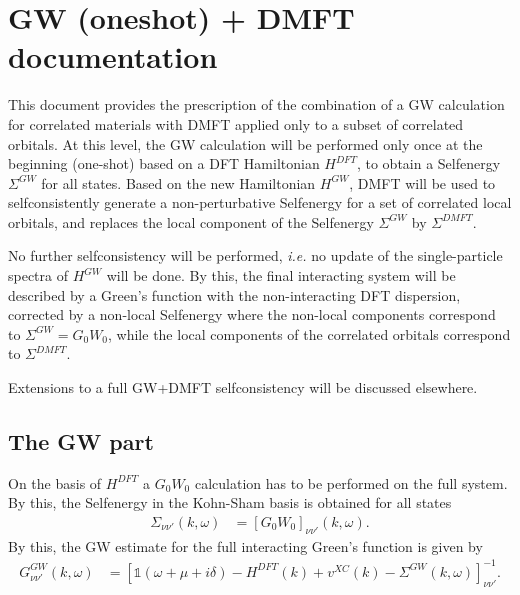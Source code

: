 \documentclass[12pt,a4paper]{scrartcl}
\numberwithin{equation}{subsection}
\newcommand{\GF}{Green's function}
\newcommand{\unity}{\mathds{1}}
\begin{document}
\section{GW (oneshot) + DMFT documentation}

This document  provides the prescription of the combination of a GW calculation
for correlated materials with DMFT applied only to a subset of correlated orbitals.
At this level, the GW calculation will be performed only once at the beginning (one-shot)
based on a DFT Hamiltonian $H^{DFT}$,
to obtain a Selfenergy $\Sigma^{GW}$ for all states. 
Based on the new Hamiltonian $H^{GW}$,
DMFT will be used to selfconsistently generate a non-perturbative Selfenergy for a set of correlated
local orbitals, and replaces the local component of the Selfenergy $\Sigma^{GW}$ by $\Sigma^{DMFT}$.

No further selfconsistency will be performed, {\it i.e.} no update of the single-particle
spectra of $H^{GW}$ will be done. By this, the final interacting system will be
described by a {\GF} with the non-interacting DFT dispersion, corrected by
a non-local Selfenergy where the non-local components
correspond to $\Sigma^{GW}=G_0W_0$, while the local components
of the correlated orbitals correspond to $\Sigma^{DMFT}$.

Extensions to a full GW+DMFT selfconsistency will be discussed elsewhere.


\subsection{The GW part}

On the basis of $H^{DFT}$ a $G_0W_0$ calculation has to be performed on the full
system. By this, the Selfenergy in the Kohn-Sham basis is obtained for all states
\begin{align}
 \Sigma_{\nu\nu'}(k,\omega)
 &= \left[ G_0W_0  \right]_{\nu\nu'}(k,\omega).
\end{align}
By this, the GW estimate for the full interacting {\GF} is given by
\begin{align}
 G^{GW}_{\nu\nu'}(k,\omega) 
 &= \left[ \unity(\omega +\mu +i\delta) -H^{DFT}(k)+v^{XC}(k) - \Sigma^{GW}(k,\omega)  \right]^{-1}_{\nu\nu'}.
\end{align}
\end{document}
